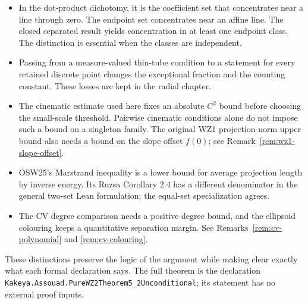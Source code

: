 \begin{itemize}
in Remark~\ref{rem:lemma66-mass-normalization}.
\item In the dot-product dichotomy, it is the coefficient set that
concentrates near a line through zero. The endpoint set concentrates
near an affine line. The closed separated result yields concentration
in at least one endpoint class. The distinction is essential when the
classes are independent.
\item Passing from a measure-valued thin-tube condition to a statement
for every retained discrete point changes the exceptional fraction
and the counting constant. These losses are kept in the radial chapter.
\item The cinematic estimate used here fixes an absolute $C^2$ bound
before choosing the small-scale threshold. Pairwise cinematic
conditions alone do not impose such a bound on a singleton family.
The original WZ1 projection-norm upper bound also needs a bound on
the slope offset $f(0)$; see Remark~\ref{rem:wz1-slope-offset}.
\item OSW25's Marstrand inequality is a lower bound for average
projection length by inverse energy. Its Ruzsa Corollary 2.4 has a
different denominator in the general two-set Lean formulation; the
equal-set specialization agrees.
\item The CV degree comparison needs a positive degree bound, and
the ellipsoid colouring keeps a quantitative separation margin.
See Remarks~\ref{rem:cv-polynomial} and \ref{rem:cv-colouring}.
\end{itemize}

These distinctions preserve the logic of the argument while making
clear exactly what each formal declaration says. The full theorem is
the declaration
\nolinkurl{Kakeya.Assouad.PureWZ2Theorem5_2Unconditional}; its statement
has no external proof inputs.
